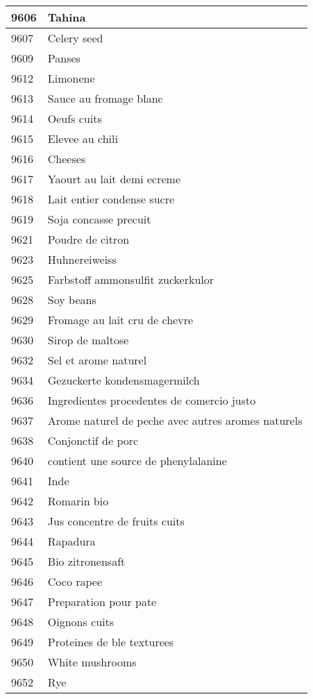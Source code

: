 \begin{longtable}{|l|l|}
9606 & Tahina \\ \hline 
9607 & Celery seed \\ \hline 
9609 & Panses \\ \hline 
9612 & Limonene \\ \hline 
9613 & Sauce au fromage blanc \\ \hline 
9614 & Oeufs cuits \\ \hline 
9615 & Elevee au chili \\ \hline 
9616 & Cheeses \\ \hline 
9617 & Yaourt au lait demi ecreme \\ \hline 
9618 & Lait entier condense sucre \\ \hline 
9619 & Soja concasse precuit \\ \hline 
9621 & Poudre de citron \\ \hline 
9623 & Huhnereiweiss \\ \hline 
9625 & Farbstoff ammonsulfit zuckerkulor \\ \hline 
9628 & Soy beans \\ \hline 
9629 & Fromage au lait cru de chevre \\ \hline 
9630 & Sirop de maltose \\ \hline 
9632 & Sel et arome naturel \\ \hline 
9634 & Gezuckerte kondensmagermilch \\ \hline 
9636 & Ingredientes procedentes de comercio justo \\ \hline 
9637 & Arome naturel de peche avec autres aromes naturels \\ \hline 
9638 & Conjonctif de porc \\ \hline 
9640 &  contient une source de phenylalanine \\ \hline 
9641 & Inde \\ \hline 
9642 & Romarin bio \\ \hline 
9643 & Jus concentre de fruits cuits \\ \hline 
9644 & Rapadura \\ \hline 
9645 & Bio zitronensaft \\ \hline 
9646 & Coco rapee \\ \hline 
9647 & Preparation pour pate \\ \hline 
9648 & Oignons cuits \\ \hline 
9649 & Proteines de ble texturees \\ \hline 
9650 & White mushrooms \\ \hline 
9652 & Rye \\ \hline 

\end{longtable}
